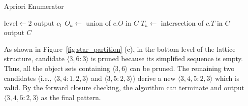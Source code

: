 \begin{algorithm}[h]
\caption{Apriori Enumerator}
\label{algo:apriori_mining}
\begin{algorithmic}[1]
 \label{code:init-start}
 \label{code:simp1}
\EndIf 
\EndFor\label{code:init-end}
\State $\mathrm{level} \gets 2$ \label{code:level}
 \label{code:level-start}
		\label{code:join-start}	
			 \label{code:join}			
			 \label{code:simp2}
			\EndIf			
		\EndFor\label{code:join-end}
		 \label{code:output1-start}
				\State output $c_1$
			\EndIf
		\EndIf \label{code:output1-end}
	\EndFor
	\State $O_u \gets $ union of $c.O$ in $C$	\label{code:fc-checking-start}
	\State $T_u \gets $ intersection of $c.T$ in $C$	
		 \label{code:fc-checking}
	\EndIf \label{code:fc-checking-end}
\EndWhile\label{code:level-ends}
\State output $C$ \label{code:output2-end}
\end{algorithmic}
\end{algorithm}



\begin{example}
As shown in Figure~\ref{fig:star_partition} (c), in the bottom level of the lattice structure, candidate $\langle 3,6:3 \rangle $ is pruned because its simplified sequence is empty. Thus, all the object sets containing $\langle 3,6 \rangle $ can be pruned. The remaining two candidates (i.e., $\langle 3,4:1,2,3 \rangle$ and $\langle 3,5:2,3 \rangle$)  derive a new  $\langle 3,4,5:2,3 \rangle$ which is valid. By the forward closure checking, the algorithm can terminate and output $\langle 3,4,5:2,3 \rangle$ as the final pattern.
\end{example}



